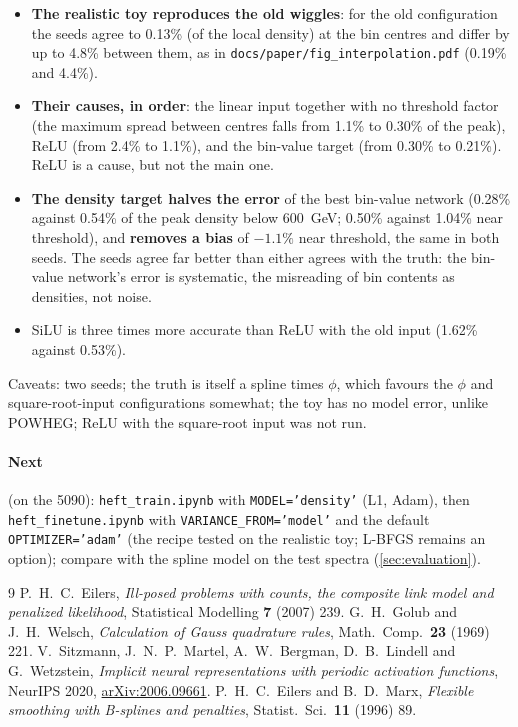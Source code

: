 \documentclass[11pt]{article}
\newcommand{\file}[1]{\nolinkurl{#1}}
\newcommand{\code}[1]{\texttt{#1}}
\begin{document}
\begin{keyidea}
\begin{itemize}
  \item \textbf{The realistic toy reproduces the old wiggles}: for the old configuration the seeds
    agree to 0.13\% (of the local density) at the bin centres and differ by up to 4.8\% between them,
    as in \file{docs/paper/fig_interpolation.pdf} (0.19\% and 4.4\%).
  \item \textbf{Their causes, in order}: the linear input together with no threshold factor (the
    maximum spread between centres falls from 1.1\% to 0.30\% of the peak), ReLU (from 2.4\% to 1.1\%),
    and the bin-value target (from 0.30\% to 0.21\%). ReLU is a cause, but not the main one.
  \item \textbf{The density target halves the error} of the best bin-value network (0.28\% against 0.54\%
    of the peak density below 600~GeV; 0.50\% against 1.04\% near threshold), and \textbf{removes a bias}
    of $-1.1\%$ near threshold, the same in both seeds. The seeds agree far better than either agrees
    with the truth: the bin-value network's error is systematic, the misreading of bin contents as
    densities, not noise.
  \item SiLU is three times more accurate than ReLU with the old input (1.62\% against 0.53\%).
\end{itemize}
Caveats: two seeds; the truth is itself a spline times $\phi$, which favours the $\phi$ and
square-root-input configurations somewhat; the toy has no model error, unlike POWHEG; ReLU with the
square-root input was not run.
\end{keyidea}

\paragraph{Next} (on the 5090): \file{heft_train.ipynb} with \code{MODEL='density'} (L1, Adam), then
\file{heft_finetune.ipynb} with \code{VARIANCE\_FROM='model'} and the default \code{OPTIMIZER='adam'} (the recipe
tested on the realistic toy; L-BFGS remains an option); compare with
the spline model on the test spectra (\cref{sec:evaluation}).

\begin{thebibliography}{9}
 P.~H.~C.~Eilers, \emph{Ill-posed problems with counts, the composite link
  model and penalized likelihood}, Statistical Modelling \textbf{7} (2007) 239.
 G.~H.~Golub and J.~H.~Welsch, \emph{Calculation of Gauss quadrature rules},
  Math.\ Comp.\ \textbf{23} (1969) 221.
 V.~Sitzmann, J.~N.~P.~Martel, A.~W.~Bergman, D.~B.~Lindell and G.~Wetzstein,
  \emph{Implicit neural representations with periodic activation functions}, NeurIPS 2020,
  \href{https://arxiv.org/abs/2006.09661}{arXiv:2006.09661}.
 P.~H.~C.~Eilers and B.~D.~Marx, \emph{Flexible smoothing with B-splines and
  penalties}, Statist.\ Sci.\ \textbf{11} (1996) 89.
\end{thebibliography}
\end{document}
